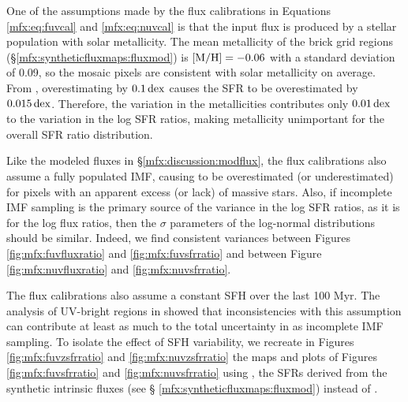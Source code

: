 \documentclass[iop, tighten]{emulateapj}
\begin{document}
One of the assumptions made by the flux calibrations in Equations
\ref{mfx:eq:fuvcal} and \ref{mfx:eq:nuvcal} is that the input flux is produced
by a stellar population with solar metallicity. The mean metallicity of the
brick grid regions (\S \ref{mfx:syntheticfluxmaps:fluxmod}) is $\mathrm{[M/H]} = -0.06$
with a standard deviation of 0.09, so the mosaic pixels are consistent with
solar metallicity on average. From \citet{Simones:2014}, overestimating \met{}
by $0.1\,\mathrm{dex}$ causes the SFR to be overestimated by $0.015\,\mathrm{dex}$. Therefore, the
variation in the metallicities contributes only $0.01\,\mathrm{dex}$ to the variation in
the log SFR ratios, making metallicity unimportant for the overall SFR ratio
distribution.

Like the modeled fluxes in \S \ref{mfx:discussion:modflux}, the flux
calibrations also assume a fully populated IMF, causing \sfrx{} to be
overestimated (or underestimated) for pixels with an apparent excess (or lack)
of massive stars. Also, if incomplete IMF sampling is the primary source of the
variance in the log SFR ratios, as it is for the log flux ratios, then the
$\sigma$ parameters of the log-normal distributions should be similar. Indeed,
we find consistent variances between Figures \ref{fig:mfx:fuvfluxratio} and
\ref{fig:mfx:fuvsfrratio} and between Figure \ref{fig:mfx:nuvfluxratio} and
\ref{fig:mfx:nuvsfrratio}.

The flux calibrations also assume a constant SFH over the last 100 Myr. The
analysis of UV-bright regions in \citet{Simones:2014} showed that
inconsistencies with this assumption can contribute at least as much to the
total uncertainty in \sfrfuv{} as incomplete IMF sampling. To isolate the
effect of SFH variability, we recreate in Figures \ref{fig:mfx:fuvzsfrratio}
and \ref{fig:mfx:nuvzsfrratio} the maps and plots of Figures
\ref{fig:mfx:fuvsfrratio} and \ref{fig:mfx:nuvsfrratio} using \sfrxz{}, the
SFRs derived from the synthetic intrinsic fluxes (see \S
\ref{mfx:syntheticfluxmaps:fluxmod}) instead of \sfrx{}.
\end{document}

